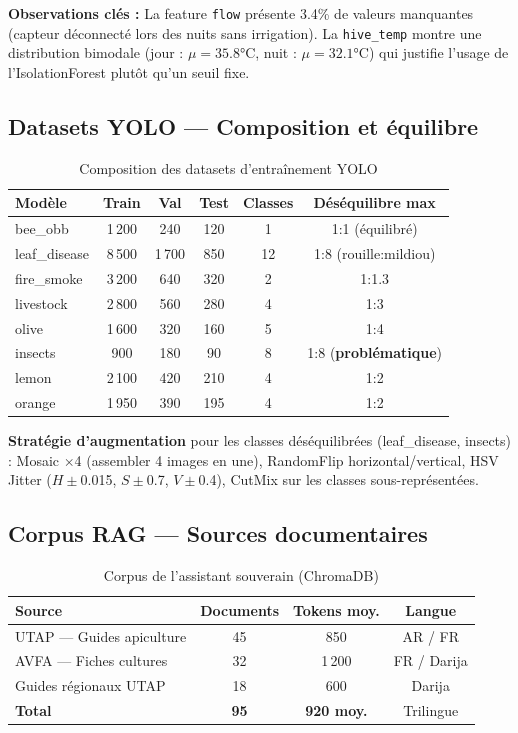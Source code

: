 \documentclass[12pt,a4paper,oneside]{report}
\newcommand{\code}[1]{\texttt{\small\color{farmgray}#1}}
\begin{document}
\noindent\textbf{Observations clés :} La feature \code{flow} présente 3.4\% de valeurs
manquantes (capteur déconnecté lors des nuits sans irrigation). La \code{hive\_temp}
montre une distribution bimodale (jour : $\mu=35.8$°C, nuit : $\mu=32.1$°C) qui
justifie l'usage de l'IsolationForest plutôt qu'un seuil fixe.

\subsection{Datasets YOLO — Composition et équilibre}

\begin{table}[H]\centering
\caption{Composition des datasets d'entraînement YOLO}
\label{tab:eda_yolo}
\small
\begin{tabular}{lccccc}
\toprule
\textbf{Modèle}&\textbf{Train}&\textbf{Val}&\textbf{Test}&\textbf{Classes}&\textbf{Déséquilibre max}\\
\midrule
bee\_obb      & 1\,200 & 240 & 120 & 1   & 1:1 (équilibré) \\
leaf\_disease & 8\,500 & 1\,700 & 850 & 12 & 1:8 (rouille:mildiou) \\
fire\_smoke   & 3\,200 & 640 & 320 & 2   & 1:1.3 \\
livestock     & 2\,800 & 560 & 280 & 4   & 1:3 \\
olive         & 1\,600 & 320 & 160 & 5   & 1:4 \\
insects       & 900    & 180 & 90  & 8   & 1:8 (\textbf{problématique}) \\
lemon         & 2\,100 & 420 & 210 & 4   & 1:2 \\
orange        & 1\,950 & 390 & 195 & 4   & 1:2 \\
\bottomrule
\end{tabular}
\end{table}

\noindent\textbf{Stratégie d'augmentation} pour les classes déséquilibrées (leaf\_disease,
insects) : Mosaic $\times$4 (assembler 4 images en une), RandomFlip horizontal/vertical,
HSV Jitter ($H\pm$0.015, $S\pm$0.7, $V\pm$0.4), CutMix sur les classes sous-représentées.

\subsection{Corpus RAG — Sources documentaires}

\begin{table}[H]\centering
\caption{Corpus de l'assistant souverain (ChromaDB)}
\label{tab:eda_rag}
\begin{tabular}{lccc}
\toprule
\textbf{Source}&\textbf{Documents}&\textbf{Tokens moy.}&\textbf{Langue}\\
\midrule
UTAP — Guides apiculture   & 45 & 850   & AR / FR \\
AVFA — Fiches cultures     & 32 & 1\,200 & FR / Darija \\
Guides régionaux UTAP      & 18 & 600   & Darija \\
\midrule
\textbf{Total}             & \textbf{95} & \textbf{920 moy.} & Trilingue \\
\bottomrule
\end{tabular}
\end{table}
\end{document}

